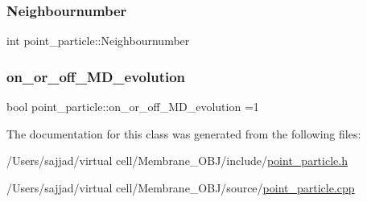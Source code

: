 \mbox{\label{classpoint__particle_a434dc5e0503b9c29546dd906b57288fd}} 
\subsubsection{\texorpdfstring{Neighbournumber}{Neighbournumber}}
{\footnotesize\ttfamily int point\+\_\+particle\+::\+Neighbournumber}

\mbox{\label{classpoint__particle_afee389a618e3c3c64e255329b1985ae3}} 
\subsubsection{\texorpdfstring{on\_or\_off\_MD\_evolution}{on\_or\_off\_MD\_evolution}}
{\footnotesize\ttfamily bool point\+\_\+particle\+::on\+\_\+or\+\_\+off\+\_\+\+M\+D\+\_\+evolution =1}



The documentation for this class was generated from the following files\+:\begin{DoxyCompactItemize}
\item 
/\+Users/sajjad/virtual cell/\+Membrane\+\_\+\+O\+B\+J/include/\mbox{\hyperlink{point__particle_8h}{point\+\_\+particle.\+h}}\item 
/\+Users/sajjad/virtual cell/\+Membrane\+\_\+\+O\+B\+J/source/\mbox{\hyperlink{point__particle_8cpp}{point\+\_\+particle.\+cpp}}\end{DoxyCompactItemize}
